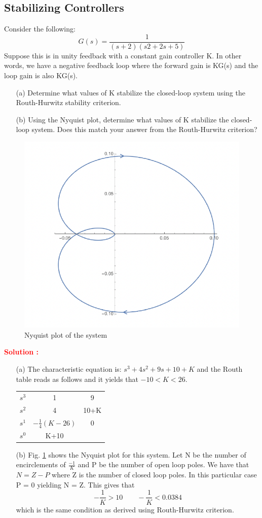 \documentclass[12pt]{article}
\begin{document}
\subsection{Stabilizing Controllers}

Consider the following:
$$G(s) =\frac{1}{(s + 2)(s2 + 2s + 5)}$$
Suppose this is in unity feedback with a constant gain controller K. In other words, we have a
negative feedback loop where the forward gain is KG(s) and the loop gain is also KG(s). 
\begin{itemize}
    \item [(a)] Determine what values of K stabilize the closed-loop system using the Routh-Hurwitz stability criterion. 
    \item [(b)] Using the Nyquist plot, determine what values of K stabilize the closed-loop system. Does this match your answer from the Routh-Hurwitz criterion?
\end{itemize}
    \begin{figure}[h!]
        \centering
        \includegraphics[width=0.5\linewidth]{figs/8.3.png}
        \caption{Nyquist plot of the system}
        \label{fig:prb12}
    \end{figure}

\textbf{\textcolor{red}{Solution :}} 
\begin{itemize}
    \item [(a)] The characteristic equation is: $s^3 + 4s^2 + 9s + 10 + K$ and the Routh table reads as follows and it yields that $-10 < K < 26$.
    \begin{table}[h!]
        \centering
        \begin{tabular}{c c c}
            $s^3$ &  1 & 9 \\
            $s^2$ &  4 & 10+K\\
            $s^1$ &  $-\frac{1}{4}(K-26)$ & 0\\
            $s^0$ & K+10 & 
        \end{tabular}
    \end{table}


    \item[(b)] Fig. \ref{fig:prb12} shows the Nyquist plot for this system. Let N be the number of encirclements of $\frac{-1}{K}$ and P be the number of open loop poles. We have that $N = Z - P$ where Z is the number of closed loop poles. In this particular case P = 0 yielding N = Z. This gives that
$$- \frac{1}{K}> 10 \qquad - \frac{1}{K}<0.0384$$
which is the same condition as derived using Routh-Hurwitz criterion.
\end{itemize}
\clearpage
\end{document}
